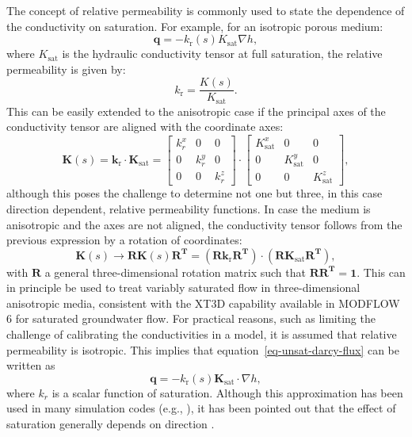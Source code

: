 \documentclass[fleqn]{article}
\begin{document}
The concept of relative permeability is commonly used to
state the dependence of the conductivity on saturation. For
example, for an isotropic porous medium:
\begin{equation}
  \mathbf{q} = - k_\textrm{r}(s) K_{\textrm{sat}} \nabla h,
\end{equation}
where $K_\textrm{sat}$ is the hydraulic conductivity tensor at full saturation,
the relative permeability is given by:
\begin{equation}
  k_\textrm{r} = \frac{K(s)}{K_{\textrm{sat}}}.
\end{equation}
This can be easily extended to the anisotropic case if the principal axes
of the conductivity tensor are aligned with the coordinate axes:
\begin{equation}
  \mathbf{K}(s) = \mathbf{k}_{\textrm{r}} \cdot \mathbf{K}_{\textrm{sat}}
  = 
  \begin{bmatrix}
    k_r^x & 0     & 0     \\
    0     & k_r^y & 0     \\
    0     & 0     & k_r^z
  \end{bmatrix} \cdot
  \begin{bmatrix}
    K_{\text{sat}}^x & 0                & 0                \\
    0                & K_{\text{sat}}^y & 0                \\
    0                & 0                & K_{\text{sat}}^z
  \end{bmatrix},
\end{equation}
although this poses the challenge to determine not one but three, in
this case direction dependent, relative permeability functions. In case the 
medium is anisotropic and the axes are not aligned, the conductivity tensor
follows from the previous expression by a rotation of coordinates:
\begin{equation}
  \mathbf{K}(s) \rightarrow \mathbf{R} \mathbf{K}(s) \mathbf{R^T}
  = (\mathbf{R} \mathbf{k}_{\textrm{r}} \mathbf{R^T}) \cdot 
  (\mathbf{R} \mathbf{K}_{\textrm{sat}} \mathbf{R^T}),
\end{equation}
with $\mathbf{R}$ a general three-dimensional rotation matrix such that
$\mathbf{R}\mathbf{R^T} = \mathbf{1}$. This can in principle be used
to treat variably saturated flow in three-dimensional anisotropic media,
consistent with the XT3D capability \cite{modflow6xt3d} available in
MODFLOW 6 for saturated groundwater flow. For practical reasons, such
as limiting the challenge of calibrating the conductivities in a model,
it is assumed that relative permeability is isotropic. This
implies that equation~\ref{eq-unsat-darcy-flux} can be written as
\begin{equation}
  \mathbf{q} = - k_\text{r}(s) \mathbf{K}_{\textrm{sat}} \cdot \nabla h,
\end{equation}
where $k_r$ is a scalar function of saturation. Although this approximation
has been used in many simulation codes 
(e.g., \cite{vs2d,modflowvsf,vosssutra,panday-surfact}), it has been
pointed out that the effect of saturation generally depends on 
direction \cite{bear-1987}.
\end{document}
